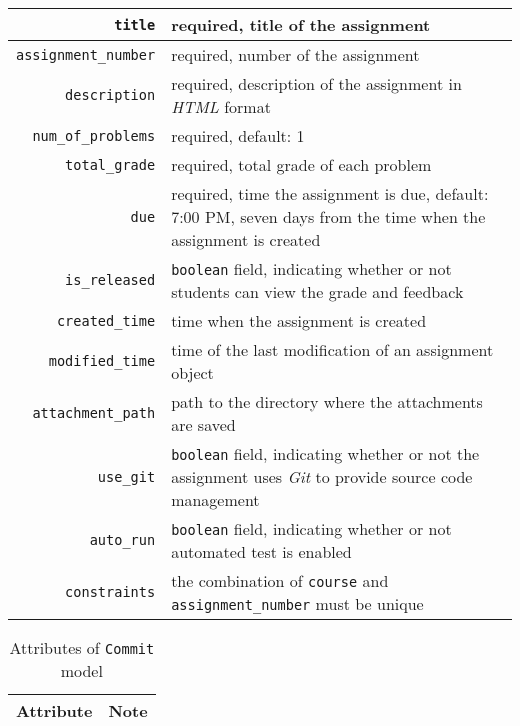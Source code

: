 \begin{itemize}
\begin{table}[H]
\begin{tabular}[ht]{r|p{4in}}
        \texttt{title} & required, title of the assignment\\
        \hline
        \texttt{assignment\_number} & required, number of the assignment\\
        \hline
        \texttt{description} & required, description of the assignment 
            in \emph{HTML} format \\
        \hline
        \texttt{num\_of\_problems} & required, default: 1 \\
        \hline
        \texttt{total\_grade} & required, total grade of each problem \\
        \hline
        \texttt{due} & required, time the assignment is due, default: 7:00 PM,
            seven days  from the time when the assignment is created \\
        \hline
        \texttt{is\_released} & \texttt{boolean} field, indicating whether or not
            students can view the grade and feedback \\
        \hline
        \texttt{created\_time} & time when the assignment is created \\
        \hline
        \texttt{modified\_time} & time of the last modification of an assignment
            object\\
        \hline
        \texttt{attachment\_path} & path to the directory where the attachments
            are saved \\
        \hline
        \hline

        \texttt{use\_git} & \texttt{boolean} field, indicating whether or not
            the  assignment uses \emph{Git} to provide source code management \\
        \hline
        \texttt{auto\_run} & \texttt{boolean} field, indicating whether or not
            automated test  is enabled \\
        \hline
        \hline

        \texttt{constraints} & the combination of \texttt{course} and \texttt{assignment\_number}
            must  be unique \\
        \hline
    \end{tabular}
    \renewcommand{\arraystretch}{1}
\end{table}

\begin{table}[ht]
    \centering
    \caption{Attributes of \texttt{Commit} model}
    \label{tab:COMMIT_ATTR}
    \renewcommand{\arraystretch}{1.3}
    \begin{tabular}[ht]{r|p{4in}}
        \hline
        Attribute & Note \\
        \hline
        \hline


\end{tabular}
\end{table}
\end{itemize}
